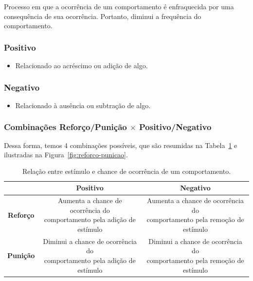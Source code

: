 \documentclass{article}
\begin{document}
                Processo em que a ocorrência de um comportamento é enfraquecida por uma consequência de sua ocorrência. Portanto, diminui a frequência do comportamento.
                
            \subsubsection{Positivo}
            
                \begin{itemize}
                    \item Relacionado ao acréscimo ou adição de algo.
                \end{itemize}
            
            \subsubsection{Negativo}
    
                \begin{itemize}
                    \item Relacionado à ausência ou subtração de algo.
                \end{itemize}
            
            \subsubsection{Combinações Reforço/Punição \texorpdfstring{$\times$}{TEXT} Positivo/Negativo}
            
                Dessa forma, temos 4 combinações possíveis, que são resumidas na Tabela~\ref{tab:reforco-punicao} e ilustradas na Figura~\ref{fig:reforco-punicao}.
            
                \begin{table}[ht]
                    \centering
                    \caption{Relação entre estímulo e chance de ocorrência de um comportamento.}
                    \label{tab:reforco-punicao}
                    \begin{tabular}{|c|c|c|}
                        \hline
                         & \textbf{Positivo} & \textbf{Negativo} \\
                        \hline
                        \textbf{Reforço} & \makecell{Aumenta a chance de ocorrência do \\ comportamento pela adição de estímulo} & \makecell{Aumenta a chance de ocorrência do \\ comportamento pela remoção de estímulo} \\
                        \hline
                        \textbf{Punição} & \makecell{Diminui a chance de ocorrência do \\ comportamento pela adição de estímulo} & \makecell{Diminui a chance de ocorrência do \\ comportamento pela remoção de estímulo} \\
                        \hline
                    \end{tabular}
                \end{table}
            
\end{document}
